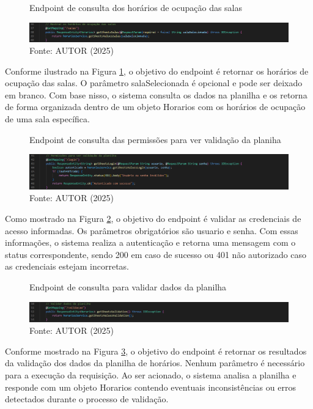 \begin{itemize}
    \begin{figure}[htb]
        \centering
        \caption{Endpoint de consulta dos horários de ocupação das salas}
        \includegraphics[width=1\textwidth]{Figuras/back-6.png}
        \caption*{Fonte: AUTOR (2025)}
        \label{fig_back_6}
    \end{figure}

    Conforme ilustrado na Figura \ref{fig_back_6}, o objetivo do endpoint é retornar os horários de ocupação das salas. O parâmetro salaSelecionada é opcional e pode ser deixado em branco. Com base nisso, o sistema consulta os dados na planilha e os retorna de forma organizada dentro de um objeto Horarios com os horários de ocupação de uma sala específica.

    \begin{figure}[htb]
        \centering
        \caption{Endpoint de consulta das permissões para ver validação da planiha}
        \includegraphics[width=1\textwidth]{Figuras/back-7.png}
        \caption*{Fonte: AUTOR (2025)}
        \label{fig_back_7}
    \end{figure}

    Como mostrado na Figura \ref{fig_back_7}, o objetivo do endpoint é validar as credenciais de acesso informadas. Os parâmetros obrigatórios são usuario e senha. Com essas informações, o sistema realiza a autenticação e retorna uma mensagem com o status correspondente, sendo 200 em caso de sucesso ou 401 não autorizado caso as credenciais estejam incorretas.

    \begin{figure}[H]
        \centering
        \caption{Endpoint de consulta para validar dados da planilha}
        \includegraphics[width=1\textwidth]{Figuras/back-8.png}
        \caption*{Fonte: AUTOR (2025)}
        \label{fig_back_8}
    \end{figure}

    Conforme mostrado na Figura \ref{fig_back_8}, o objetivo do endpoint é retornar os resultados da validação dos dados da planilha de horários. Nenhum parâmetro é necessário para a execução da requisição. Ao ser acionado, o sistema analisa a planilha e responde com um objeto Horarios contendo eventuais inconsistências ou erros detectados durante o processo de validação.
\end{itemize}

